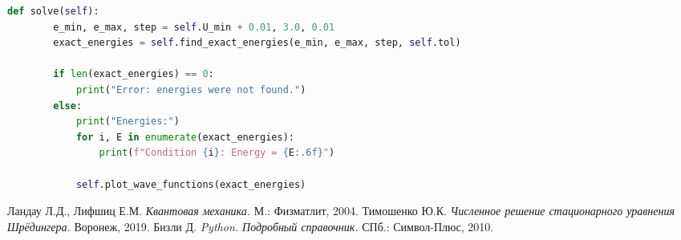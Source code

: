 \documentclass[a4paper,12pt]{article}
\begin{document}
\begin{lstlisting}[language=Python, caption=Код файла solver.py,label={lst:solver}]
    def solve(self):
        e_min, e_max, step = self.U_min + 0.01, 3.0, 0.01
        exact_energies = self.find_exact_energies(e_min, e_max, step, self.tol)

        if len(exact_energies) == 0:
            print("Error: energies were not found.")
        else:
            print("Energies:")
            for i, E in enumerate(exact_energies):
                print(f"Condition {i}: Energy = {E:.6f}")

            self.plot_wave_functions(exact_energies)
\end{lstlisting}

\newpage
\begin{thebibliography}{9}
 Ландау Л.Д., Лифшиц Е.М. \textit{Квантовая механика.} М.: Физматлит, 2004.
 Тимошенко Ю.К. \textit{Численное решение стационарного уравнения Шрёдингера.} Воронеж, 2019.
 Бизли Д. \textit{Python. Подробный справочник.} СПб.: Символ-Плюс, 2010.
\end{thebibliography}
\end{document}
